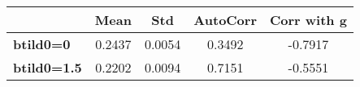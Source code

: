 \begin{tiny}\begin{tabular}{|l|c|c|c|c|}
\hline
&\textbf{Mean}&\textbf{Std}&\textbf{AutoCorr}&\textbf{Corr with g}\\\hline
\textbf{btild0=0}&0.2437&0.0054&0.3492&-0.7917\\\hline
\textbf{btild0=1.5}&0.2202&0.0094&0.7151&-0.5551\\\hline
\end{tabular}
\end{tiny}